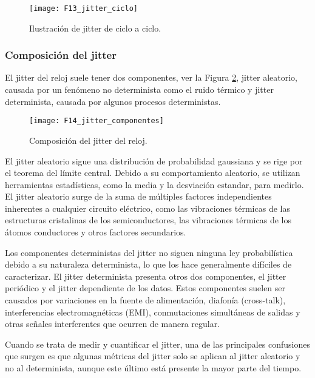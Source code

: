                 \begin{figure}[hbtp]
                    \caption{Ilustración de jitter de ciclo a ciclo.}
                    \centering
                    \texttt{[image: F13\_jitter\_ciclo]}
                    \label{fig:F13_jitter_ciclo}
                \end{figure}

            \subsubsection{Composición del jitter}

                El jitter del reloj suele tener dos componentes, ver la Figura \ref{fig:F14_jitter_componentes}, jitter aleatorio, causada por un fenómeno no determinista como el ruido térmico y jitter determinista, causada por algunos procesos deterministas.

                \begin{figure}[hbtp]
                    \caption{Composición del jitter del reloj.}
                    \centering
                    \texttt{[image: F14\_jitter\_componentes]}
                    \label{fig:F14_jitter_componentes}
                \end{figure}

                El jitter aleatorio sigue una distribución de probabilidad gaussiana y se rige por el teorema del límite central. Debido a su comportamiento aleatorio, se utilizan herramientas estadísticas, como la media y la desviación estandar, para medirlo. El jitter aleatorio surge de la suma de múltiples factores independientes inherentes a cualquier circuito eléctrico, como las vibraciones térmicas de las estructuras cristalinas de los semiconductores, las vibraciones térmicas de los átomos conductores y otros factores secundarios.

                Los componentes deterministas del jitter no siguen ninguna ley probabilística debido a su naturaleza determinista, lo que los hace generalmente difíciles de caracterizar. El jitter determinista presenta otros dos componentes, el jitter periódico y el jitter dependiente de los datos. Estos componentes suelen ser causados por variaciones en la fuente de alimentación, diafonía (cross-talk), interferencias electromagnéticas (EMI), conmutaciones simultáneas de salidas y otras señales interferentes que ocurren de manera regular.

                Cuando se trata de medir y cuantificar el jitter, una de las principales confusiones que surgen es que algunas métricas del jitter solo se aplican al jitter aleatorio y no al determinista, aunque este último está presente la mayor parte del tiempo.

